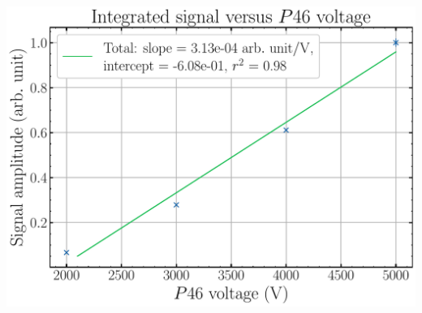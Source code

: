 \begin{frame}[t]
\begin{columns}[T]
\begin{column}{0.45\textwidth}
{      \includegraphics[width=1\textwidth]{06_Backup/fig/fig000_P46_gain}%
      }%
\end{column}
\end{columns}
\end{frame}
